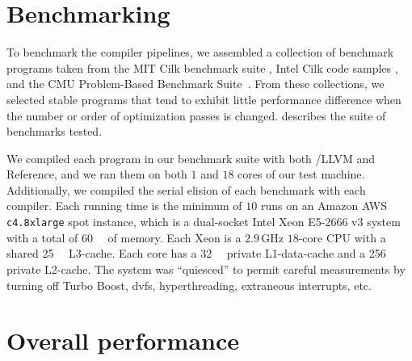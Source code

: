 \section{Benchmarking}

To benchmark the compiler pipelines, we assembled a collection of
benchmark programs taken from the MIT Cilk benchmark suite
\cite{FrigoLeRa98}, Intel Cilk code samples \cite{IntelCilkSamples},
and the CMU Problem-Based Benchmark Suite~\cite{ShunBlFi12}.  From
these collections, we selected stable programs that tend to exhibit
little performance difference when the number or order of optimization
passes is changed.   describes the suite of benchmarks
tested.

We compiled each program in our benchmark suite with both \tapir/LLVM
and Reference, and we ran them on both $1$ and $18$ cores of our test
machine.  Additionally, we compiled the serial elision of each
benchmark with each compiler.  Each running time is the minimum of
$10$ runs on an Amazon AWS \texttt{c4.8xlarge} spot instance, which is
a dual-socket Intel Xeon E5-2666 v3 system with a total of
\SI{60}{\gibi\byte} of memory.  Each Xeon is a $2.9$\,GHz $18$-core
CPU with a shared \SI{25}{\mebi\byte} L3-cache.  Each core has a
\SI{32}{\kibi\byte} private L1-data-cache and a \SI{256}{\kibi\byte}
private L2-cache.  The system was ``quiesced'' to permit careful
measurements by turning off Turbo Boost, dvfs, hyperthreading,
extraneous interrupts, etc.


\section{Overall performance}

